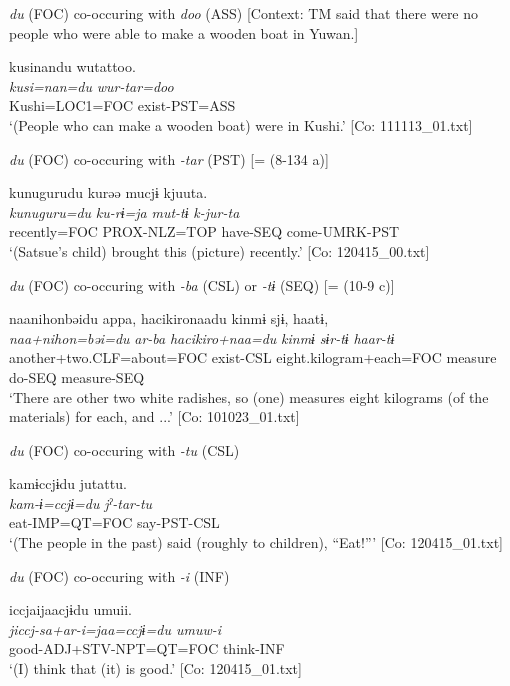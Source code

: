   \ex \textit{du} (FOC) co-occuring with \textit{doo} (ASS)
  [Context: TM said that there were no people who were able to make a wooden boat in Yuwan.]
  
      \glll    kusinandu  wutattoo.\\
    \textit{kusi=nan=du}  \textit{wur-tar=doo}\\
    Kushi=LOC1=FOC  exist-PST=ASS\\
\glt     ‘(People who can make a wooden boat) were in Kushi.’ [Co: 111113\_01.txt]

  \ex \textit{du} (FOC) co-occuring with \textit{{}-tar} (PST) [= (8-134 a)]
  
      \glll    kunugurudu  kurəə  mucjɨ\footnotemark[1]{}  kjuuta.\\
    \textit{kunuguru=du}  \textit{ku-rɨ=ja}  \textit{mut-tɨ}  \textit{k-jur-ta}\\
    recently=FOC  PROX-NLZ=TOP  have-SEQ  come-UMRK-PST\\
\glt     ‘(Satsue’s child) brought this (picture) recently.’ [Co: 120415\_00.txt]

  \ex \textit{du} (FOC) co-occuring with \textit{{}-ba} (CSL) or \textit{-tɨ} (SEQ) [= (10-9 c)]

  
      \glll    naa{\textbar}nihon{\textbar}bəidu  appa,  {\textbar}hacikiro{\textbar}naadu kinmɨ  sjɨ,  haatɨ,\\
    \textit{naa+nihon=bəi=du}  \textit{ar-ba}  \textit{hacikiro+naa=du}  \textit{kinmɨ}  \textit{sɨr-tɨ}  \textit{haar-tɨ}\\
    another+two.CLF=about=FOC  exist-CSL  eight.kilogram+each=FOC  measure  do-SEQ  measure-SEQ\\    
    ‘There are other two white radishes, so (one) measures eight kilograms (of the materials) for each, and ...’    [Co: 101023\_01.txt]

  \ex \textit{du} (FOC) co-occuring with \textit{{}-tu} (CSL)

  
      \glll    kamɨccjɨdu  jutattu.\\
    \textit{kam-ɨ=ccjɨ=du}  \textit{jˀ-tar-tu}\\
    eat-IMP=QT=FOC  say-PST-CSL\\
\glt     ‘(The people in the past) said (roughly to children), “Eat!”’ [Co: 120415\_01.txt]

  \ex \textit{du} (FOC) co-occuring with \textit{{}-i} (INF)

  
      \glll    iccjaijaacjɨdu  umuii.\\
    \textit{jiccj}\footnotemark[2]{}\textit{{}-sa+ar-i=jaa=ccjɨ=du  umuw-i}\\
    good-ADJ+STV-NPT=QT=FOC  think-INF\\
    \glt     ‘(I) think that (it) is good.’ [Co: 120415\_01.txt]
\z
\z
{}


